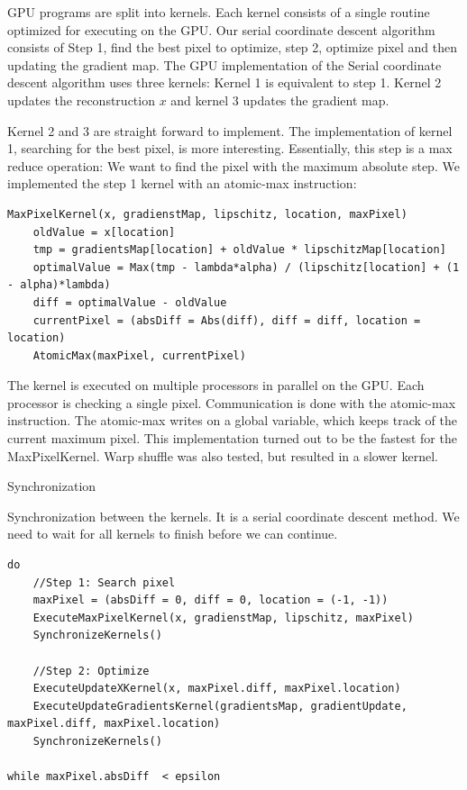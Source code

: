 GPU programs are split into kernels. Each kernel consists of a single routine optimized for executing on the GPU. Our serial coordinate descent algorithm consists of Step 1, find the best pixel to optimize, step 2, optimize pixel and then updating the gradient map. The GPU implementation of the Serial coordinate descent algorithm uses three kernels: Kernel 1 is equivalent to step 1. Kernel 2 updates the reconstruction $x$ and kernel 3 updates the gradient map.

Kernel 2 and 3 are straight forward to implement. The implementation of kernel 1, searching for the best pixel, is more interesting. Essentially, this step is a max reduce operation: We want to find the pixel with the maximum absolute step. We implemented the step 1 kernel with an atomic-max instruction:
\begin{lstlisting}
MaxPixelKernel(x, gradienstMap, lipschitz, location, maxPixel)
	oldValue = x[location]
	tmp = gradientsMap[location] + oldValue * lipschitzMap[location]
	optimalValue = Max(tmp - lambda*alpha) / (lipschitz[location] + (1 - alpha)*lambda)
	diff = optimalValue - oldValue
	currentPixel = (absDiff = Abs(diff), diff = diff, location = location)
	AtomicMax(maxPixel, currentPixel)
\end{lstlisting}

The kernel is executed on multiple processors in parallel on the GPU. Each processor is checking a single pixel. Communication is done with the atomic-max instruction. The atomic-max writes on a global variable, which keeps track of the current maximum pixel. This implementation turned out to be the fastest for the MaxPixelKernel. Warp shuffle\cite{keplerShuffle} was also tested, but resulted in a slower kernel.

Synchronization

Synchronization between the kernels. It is a serial coordinate descent method. We need to wait for all kernels to finish before we can continue.


\begin{lstlisting}
do 
	//Step 1: Search pixel
	maxPixel = (absDiff = 0, diff = 0, location = (-1, -1))
	ExecuteMaxPixelKernel(x, gradienstMap, lipschitz, maxPixel)
	SynchronizeKernels()
	
	//Step 2: Optimize
	ExecuteUpdateXKernel(x, maxPixel.diff, maxPixel.location)
	ExecuteUpdateGradientsKernel(gradientsMap, gradientUpdate, maxPixel.diff, maxPixel.location)
	SynchronizeKernels()
	
while maxPixel.absDiff  < epsilon
\end{lstlisting}

